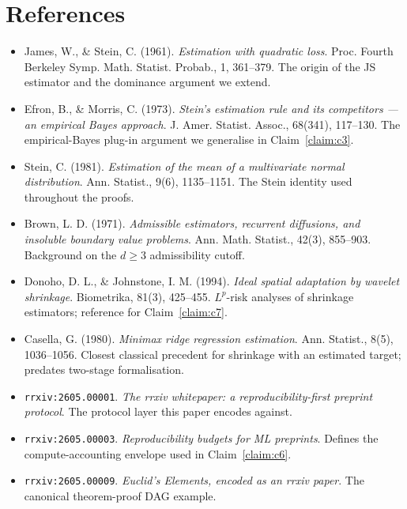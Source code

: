 \documentclass{rrxiv}
\begin{document}
\section{References}
\begin{itemize}[leftmargin=*]
\item James, W., \& Stein, C. (1961). \emph{Estimation with quadratic loss}.
  Proc. Fourth Berkeley Symp. Math. Statist. Probab., 1, 361--379. The
  origin of the JS estimator and the dominance argument we extend.
\item Efron, B., \& Morris, C. (1973). \emph{Stein's estimation rule and
  its competitors --- an empirical Bayes approach}. J. Amer. Statist.
  Assoc., 68(341), 117--130. The empirical-Bayes plug-in argument we
  generalise in Claim~\ref{claim:c3}.
\item Stein, C. (1981). \emph{Estimation of the mean of a multivariate normal
  distribution}. Ann. Statist., 9(6), 1135--1151. The Stein identity used
  throughout the proofs.
\item Brown, L. D. (1971). \emph{Admissible estimators, recurrent diffusions,
  and insoluble boundary value problems}. Ann. Math. Statist., 42(3),
  855--903. Background on the $d \geq 3$ admissibility cutoff.
\item Donoho, D. L., \& Johnstone, I. M. (1994). \emph{Ideal spatial
  adaptation by wavelet shrinkage}. Biometrika, 81(3), 425--455.
  $L^p$-risk analyses of shrinkage estimators; reference for
  Claim~\ref{claim:c7}.
\item Casella, G. (1980). \emph{Minimax ridge regression estimation}. Ann.
  Statist., 8(5), 1036--1056. Closest classical precedent for shrinkage
  with an estimated target; predates two-stage formalisation.
\item \texttt{rrxiv:2605.00001}. \emph{The rrxiv whitepaper: a
  reproducibility-first preprint protocol}. The protocol layer this paper
  encodes against.
\item \texttt{rrxiv:2605.00003}. \emph{Reproducibility budgets for ML
  preprints}. Defines the compute-accounting envelope used in
  Claim~\ref{claim:c6}.
\item \texttt{rrxiv:2605.00009}. \emph{Euclid's Elements, encoded as an
  rrxiv paper}. The canonical theorem-proof DAG example.
\end{itemize}
\end{document}
